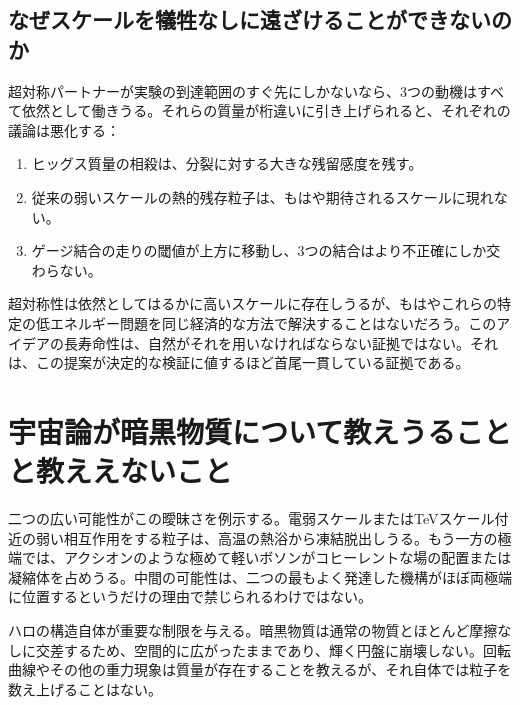 \subsection{なぜスケールを犠牲なしに遠ざけることができないのか}

超対称パートナーが実験の到達範囲のすぐ先にしかないなら、3つの動機はすべて依然として働きうる。それらの質量が桁違いに引き上げられると、それぞれの議論は悪化する：
\begin{enumerate}
\item ヒッグス質量の相殺は、分裂に対する大きな残留感度を残す。
\item 従来の弱いスケールの熱的残存粒子は、もはや期待されるスケールに現れない。
\item ゲージ結合の走りの閾値が上方に移動し、3つの結合はより不正確にしか交わらない。
\end{enumerate}
超対称性は依然としてはるかに高いスケールに存在しうるが、もはやこれらの特定の低エネルギー問題を同じ経済的な方法で解決することはないだろう。このアイデアの長寿命性は、自然がそれを用いなければならない証拠ではない。それは、この提案が決定的な検証に値するほど首尾一貫している証拠である。

\section{宇宙論が暗黒物質について教えうることと教ええないこと}

\begin{classroomqa}
\end{classroomqa}

二つの広い可能性がこの曖昧さを例示する。電弱スケールまたはTeVスケール付近の弱い相互作用をする粒子は、高温の熱浴から凍結脱出しうる。もう一方の極端では、アクシオンのような極めて軽いボソンがコヒーレントな場の配置または凝縮体を占めうる。中間の可能性は、二つの最もよく発達した機構がほぼ両極端に位置するというだけの理由で禁じられるわけではない。

ハロの構造自体が重要な制限を与える。暗黒物質は通常の物質とほとんど摩擦なしに交差するため、空間的に広がったままであり、輝く円盤に崩壊しない。回転曲線やその他の重力現象は質量が存在することを教えるが、それ自体では粒子を数え上げることはない。

